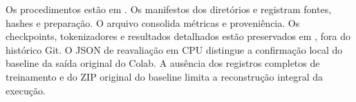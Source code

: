\documentclass[conference]{IEEEtran}
\begin{document}
Os procedimentos estão em . Os manifestos dos diretórios  e  registram fontes, hashes e preparação. O arquivo  consolida métricas e proveniência. Os checkpoints, tokenizadores e resultados detalhados estão preservados em , fora do histórico Git. O JSON de reavaliação em CPU distingue a confirmação local do baseline da saída original do Colab. A ausência dos registros completos de treinamento e do ZIP original do baseline limita a reconstrução integral da execução.



\end{document}
